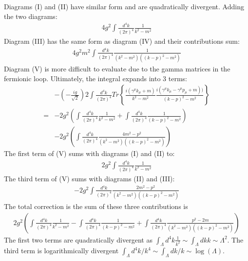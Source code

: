 Diagrams (I) and (II) have similar form and are quadratically divergent. Adding the two diagrams:
\begin{align*}
4g^2 \int \frac{d^4k}{(2\pi)^4} \frac{1}{k^2 - m^2}
\end{align*} 
Diagram (III) has the same form as diagram (IV) and their contributions sum:
\begin{align*}
4g^2m^2 \int \frac{d^4k}{(2\pi)^4}\frac{1}{(k^2-m^2)((k-p)^2 - m^2)}
\end{align*}
Diagram (V) is more difficult to evaluate due to the gamma matrices in the fermionic loop. Ultimately, the integral expands into 3 terms:
\begin{align*}
&-\left(-\frac{ig}{\sqrt{2}}\right) 2 \int \frac{d^4k}{(2\pi)^4} Tr
 \left \{ \frac{i(\gamma^\mu k_\mu + m)}{k^2-m^2} \frac{i(\gamma^\mu k_\mu - \gamma^\mu p_\mu +m))}{(k-p)^2 - m^2}     \right \} \\
=& -2g^2 \left ( \int \frac{d^4k}{(2\pi)^4} \frac{1}{k^2-m^2} + \int \frac{d^4k}{(2\pi)^4} \frac{1}{(k-p)^2 -m^2} \right ) \\
 & -2g^2 \left (\int \frac{d^4k}{(2\pi)^4} \frac{4m^2 -p^2}{(k^2-m^2)((k-p)^2 -m^2)}  \right)
\end{align*}
The first term of (V) sums with diagrams (I) and (II) to:
\begin{align*}
2g^2 \int \frac{d^4k}{(2\pi)^4} \frac{1}{k^2 - m^2}
\end{align*}
The third term of (V) sums with diagrams (II) and (III):
\begin{align*}
-2g^2 \int  \frac{d^4k}{(2\pi)^4} \frac{2m^2 - p^2}{(k^2-m^2)((k-p)^2 - m^2)}
\end{align*}
The total correction is the sum of these three contributions is
\begin{align*}
2g^2 \left ( \int \frac{d^4k}{(2\pi)^4} \frac{1}{k^2-m^2} - \int \frac{d^4k}{(2\pi)^4} \frac{1}{(k-p)^2 -m^2} + \int \frac{d^4k}{(2\pi)^4 }\frac{p^2-2m}{(k^2-m^2)((k-p)^2 - m^2)} \right)
\end{align*}
The first two terms are quadratically divergent as $\int_\Lambda d^4k \frac{1}{k^2} \sim  \int_\Lambda dk k \sim \Lambda^2$. The third term is logarithmically divergent $\int_\Lambda d^4k/k^4\sim \int_\Lambda dk/k \sim \log(\Lambda)$. 

